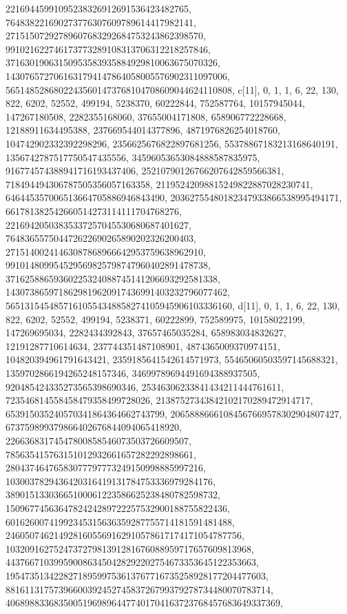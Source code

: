 {{{   22169445991095238326912691536423482765, 
   764838221690273776307609789614417982141, 
   27151507292789607683292684753243862398570, 
   991021622746173773289108313706312218257846, 
   37163019063150953583935884929810063675070326, 
   1430765727061631794147864058005576902311097006, 
   56514852868022435601473768104708609044624110808}}, 
 {c[11], {0, 1, 1, 6, 22, 130, 822, 6202, 52552, 499194, 5238370, 60222844, 
   752587764, 10157945044, 147267180508, 2282355168060, 37655004171808, 
   658906772228668, 12188911634495388, 237669544014377896, 
   4871976826254018760, 104742902332392298296, 2356625676822897681256, 
   55378867183213168640191, 1356742787517750547435556, 
   34596053653084888587835975, 916774574388941716193437406, 
   25210790126766207642859566381, 718494494306787505356057163358, 
   21195242098815249822887028230741, 646445357006513664705886946843490, 
   20362755480182347933866538995494171, 661781382542660514273114111704768276, 
   22169420503835337257045530680687401627, 
   764836557504472622690265890202326200403, 
   27151400241463087868966642953759638962910, 
   991014809954529569825798747960402891478738, 
   37162588659360225324088745141206693292581338, 
   1430738659718629819620917436991403232796077462, 
   56513154548571610554348858274105945906103336160}}, 
 {d[11], {0, 1, 1, 6, 22, 130, 822, 6202, 52552, 499194, 5238371, 60222899, 
   752589975, 10158022199, 147269695034, 2282434392843, 37657465035284, 
   658983034832627, 12191287710614634, 237744351487108901, 
   4874365009370974151, 104820394961791643421, 2359185641542614571973, 
   55465060503597145688321, 1359702866194265248157346, 
   34699789694491694388937505, 920485424335273565398690346, 
   25346306233841434211444761611, 723546814558458479358499728026, 
   21387527343842102170289472914717, 653915035240570341864364662743799, 
   20658886661084567669578302904807427, 673759899379866402676844094065418920, 
   22663683174547800858546073503726609507, 
   785635415763151012932661657282292898661, 
   28043746476583077797773249150998885997216, 
   1030037829436420316419131784753336979284176, 
   38901513303665100061223586625238480782598732, 
   1509677456364782424289722257532900188755822436, 
   60162600741992345315636359287755714181591481488, 
   2460507462149281605569162910578617174171054787756, 
   103209162752473727981391281676088959717657609813968, 
   4437667103995900863450428292202754673353645122353663, 
   195473513422827189599753613767716735258928177204477603, 
   8816113175739660039245274583726799379278734480070783714, 
   406898833683500519698964477401704163723768457683649337369, 
}}}
